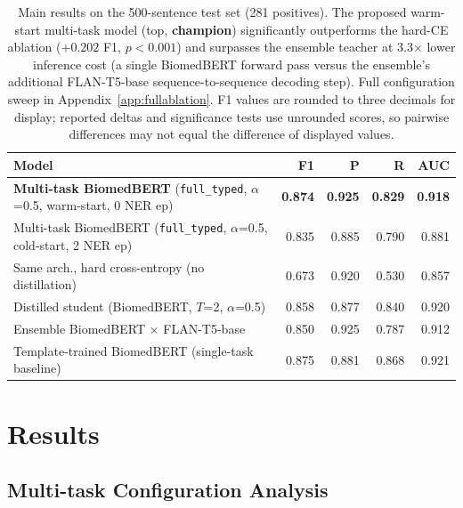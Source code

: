 \documentclass[11pt,twocolumn]{article}
\begin{document}
\begin{table}[!t]
\centering
\small
\caption{Main results on the 500-sentence test set (281 positives).
The proposed warm-start multi-task model (top, \textbf{champion}) significantly outperforms the
hard-CE ablation ($+0.202$ F1, $p{<}0.001$) and surpasses the ensemble teacher
at 3.3$\times$ lower inference cost (a single BiomedBERT forward pass versus
the ensemble's additional FLAN-T5-base sequence-to-sequence decoding step).
Full configuration sweep in Appendix~\ref{app:fullablation}. F1 values are
rounded to three decimals for display; reported deltas and significance
tests use unrounded scores, so pairwise differences may not equal the
difference of displayed values.}
\label{tab:main_results}
\begin{tabular}{lrrrr}
\toprule
\textbf{Model} & \textbf{F1} & \textbf{P} & \textbf{R} & \textbf{AUC} \\
\midrule
\rowcolor{bestrow}
\textbf{Multi-task BiomedBERT} (\texttt{full\_typed}, $\alpha$=0.5, warm-start, 0 NER ep) & \textbf{0.874} & \textbf{0.925} & \textbf{0.829} & \textbf{0.918} \\
\midrule
\rowcolor{greyrow}
Multi-task BiomedBERT (\texttt{full\_typed}, $\alpha$=0.5, cold-start, 2 NER ep) & 0.835 & 0.885 & 0.790 & 0.881 \\
\rowcolor{greyrow}
Same arch., hard cross-entropy (no distillation)    & 0.673 & 0.920 & 0.530 & 0.857 \\
\rowcolor{greyrow}
Distilled student (BiomedBERT, $T$=2, $\alpha$=0.5) & 0.858 & 0.877 & 0.840 & 0.920 \\
\rowcolor{greyrow}
Ensemble BiomedBERT $\times$ FLAN-T5-base           & 0.850 & 0.925 & 0.787 & 0.912 \\
\rowcolor{greyrow}
Template-trained BiomedBERT (single-task baseline)  & 0.875 & 0.881 & 0.868 & 0.921 \\
\bottomrule
\end{tabular}
\end{table}

\section{Results}
\label{sec:results}

\subsection{Multi-task Configuration Analysis}
\end{document}
